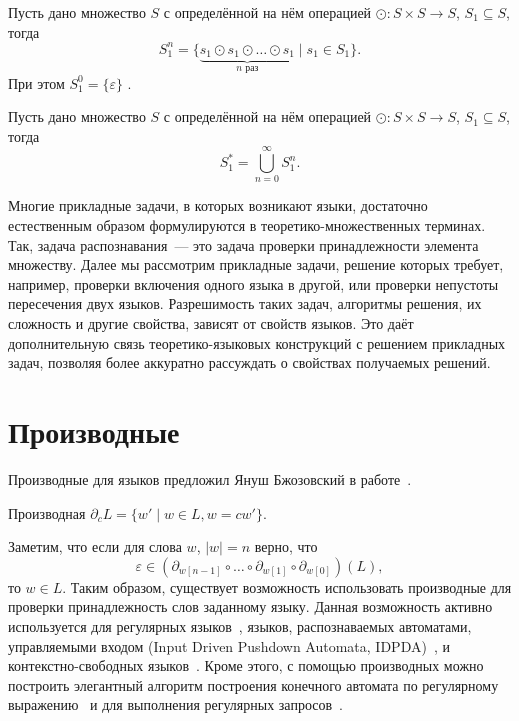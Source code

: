 \begin{definition}[TODO: ???]
    Пусть дано множество $S$ с определённой на нём операцией $\odot: S \times S \to S$, $S_1 \subseteq S$, тогда
    \[S_1^n = \{ \underbrace{s_1 \odot s_1 \odot \dots \odot s_1}_{\text{$n$ раз}} \mid s_1 \in S_1\}.\]
    При этом $S_1^0 = \{\varepsilon\}$%
    .
\end{definition}

\begin{definition}[TODO: ???]
    Пусть дано множество $S$ с определённой на нём операцией $\odot: S \times S \to S$, $S_1 \subseteq S$, тогда
    \[S_1^* = \bigcup_{n = 0}^{\infty} S_1^n.\]
\end{definition}

Многие прикладные задачи, в которых возникают языки, достаточно естественным образом формулируются в теоретико-множественных терминах.
Так, задача распознавания~--- это задача проверки принадлежности элемента множеству.
Далее мы рассмотрим прикладные задачи, решение которых требует, например, проверки включения одного языка в другой, или проверки непустоты пересечения двух языков.
Разрешимость таких задач, алгоритмы решения, их сложность и другие свойства, зависят от свойств языков.
Это даёт дополнительную связь теоретико-языковых конструкций с решением прикладных задач, позволяя более аккуратно рассуждать о свойствах получаемых решений.

\section{Производные}

Производные для языков предложил Януш Бжозовский в работе~.

\begin{definition}
    Производная $\partial_c L = \{ w' \mid w \in L, w = cw'\}$.
\end{definition}

Заметим, что если для слова $w$, $|w| = n$ верно, что
\[\varepsilon \in (\partial_{w[n-1]} \circ \dots \circ \partial_{w[1]}  \circ \partial_{w[0]}) (L),\]
то $w \in L$.
Таким образом, существует возможность использовать производные для проверки принадлежность слов заданному языку.
Данная возможность активно используется для регулярных языков~, языков, распознаваемых автоматами, управляемыми входом (Input Driven Pushdown Automata, IDPDA)~, и контекстно-свободных языков~.
Кроме этого, с помощью производных можно построить элегантный алгоритм построения конечного автомата по регулярному выражению~ и для выполнения регулярных запросов~.

